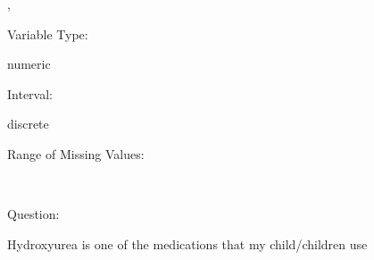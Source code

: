 \documentclass[
]{article}
\begin{document}
,

\begin{minipage}[t]{0.3\linewidth}

\colorbox{mypink1}{}

\end{minipage}%
\begin{minipage}[t]{0.7\linewidth}

\colorbox{mypink1}{\makebox[\textwidth]{\strut\bfseries\color{black}  
 }}

\end{minipage}

\begin{minipage}[t]{0.3\linewidth}

Variable Type:

\end{minipage}%
\begin{minipage}[t]{0.7\linewidth}

numeric

\end{minipage}

\begin{minipage}[t]{0.3\linewidth}

Interval:

\end{minipage}%
\begin{minipage}[t]{0.7\linewidth}

discrete

\end{minipage}

\begin{minipage}[t]{0.3\linewidth}

Range of Missing Values:

\end{minipage}%
\begin{minipage}[t]{0.7\linewidth}

~

\end{minipage}

\begin{minipage}[t]{0.3\linewidth}

Question:

\end{minipage}%
\begin{minipage}[t]{0.7\linewidth}

Hydroxyurea is one of the medications that my child/children use

\end{minipage}
\end{document}
